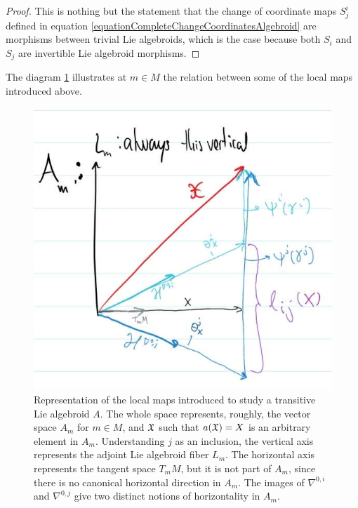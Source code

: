 \begin{proof}
This is nothing but the statement that the change of coordinate maps $S^i_j$ defined in equation \eqref{equationCompleteChangeCoordinatesAlgebroid} are morphisms between trivial Lie algebroids, which is the case because both $S_i$ and $S_j$ are invertible Lie algebroid morphisms.
\end{proof}


The diagram \ref{fig:localMaps} illustrates at $m \in M$ the relation between some of the local maps introduced above.

\begin{figure}[t]
    \centering
    \includegraphics[width = \textwidth/2]{images/DiagramaMapasLocalesAlgebroide.jpg}
    \caption{Representation of the local maps introduced to study a transitive Lie algebroid $A$. The whole space represents, roughly, the vector space $A_m$ for $m \in M$, and $\mathfrak{X}$ such that $a(\mathfrak{X}) = X$ is an arbitrary element in $A_m$. Understanding $j$ as an inclusion, the vertical axis represents the adjoint Lie algebroid fiber $L_m$. The horizontal axis represents the tangent space $T_m M$, but it is not part of $A_m$, since there is no canonical horizontal direction in $A_m$. The images of $\nabla^{0,i}$ and $\nabla^{0,j}$ give two distinct notions of horizontality in $A_m$.}
    \label{fig:localMaps}
\end{figure}

